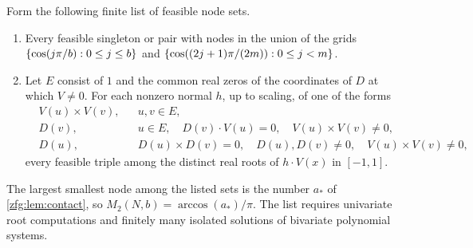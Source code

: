 \begin{theorem}\label{zfg:thm:threerule}
Form the following finite list of feasible node sets.
\begin{enumerate}
\item Every feasible singleton or pair with nodes in the union of the grids $\{\cos(j\pi/b):0\le j\le b\}$ and
$\{\cos((2j+1)\pi/(2m)):0\le j<m\}$.
\item Let $E$ consist of $1$ and the common real zeros of the coordinates of $D$ at which $V\ne0$. For each nonzero
normal $h$, up to scaling, of one of the forms
\[
\begin{aligned}
 &V(u)\times V(v), && u,v\in E,\\
 &D(v), && u\in E,\quad D(v)\cdot V(u)=0,\quad V(u)\times V(v)\ne0,\\
 &D(u), && D(u)\times D(v)=0,\quad D(u),D(v)\ne0,\quad V(u)\times V(v)\ne0,
\end{aligned}
\]
every feasible triple among the distinct real roots of $h\cdot V(x)$ in $[-1,1]$.
\end{enumerate}
The largest smallest node among the listed sets is the number $a_*$ of \cref{zfg:lem:contact}, so
$M_2(N,b)=\arccos(a_*)/\pi$. The list requires univariate root computations and finitely many isolated solutions of
bivariate polynomial systems.
\end{theorem}

